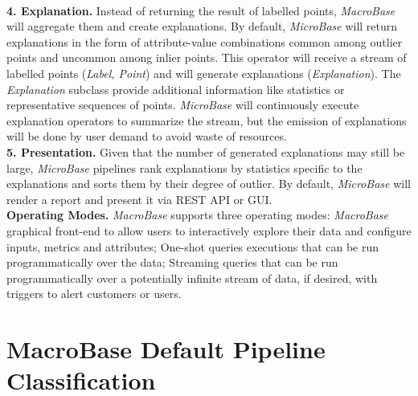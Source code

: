 \documentclass[11pt, titlepage]{article}
\begin{document}
\begin{flushleft}
		\\\textbf{4. Explanation.} Instead of returning the result of labelled points, \textit{MacroBase} will aggregate them and create explanations. By default, \textit{MicroBase} will return explanations in the form of attribute-value combinations common among outlier points and uncommon among inlier points. This operator will receive a stream of labelled points (\textit{Label, Point}) and will generate explanations (\textit{Explanation}). The \textit{Explanation} subclass provide additional information like statistics or representative sequences of points. \textit{MicroBase} will continuously execute explanation operators to summarize the stream, but the emission of explanations will be done by user demand to avoid waste of resources.
		\\\textbf{5. Presentation.} Given that the number of generated explanations may still be large, \textit{MicroBase} pipelines rank explanations by statistics specific to the explanations and sorts them by their degree of outlier. By default, \textit{MicroBase} will render a report and present it via REST API or GUI.
		\\\textbf{Operating Modes.} \textit{MacroBase} supports three operating modes: \textit{MacroBase} graphical front-end to allow users to interactively explore their data and configure inputs, metrics and attributes; One-shot queries executions that can be run programmatically over the data; Streaming queries that can be run programmatically over a potentially infinite stream of data, if desired, with triggers to alert customers or users.
	\end{flushleft}
	\section{MacroBase Default Pipeline Classification}
	\begin{flushleft}
	\end{flushleft}
\end{document}
